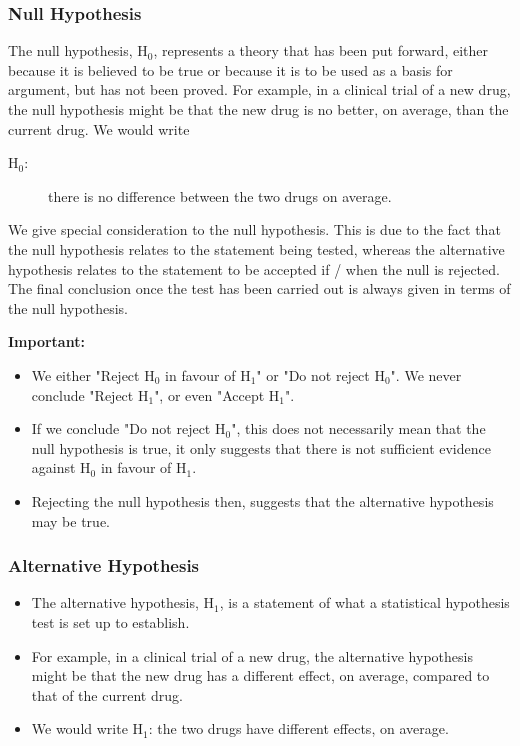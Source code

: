 \documentclass{beamer}
\begin{document}
\begin{frame}
\frametitle{Null Hypothesis}
	The null hypothesis, H$_0$, represents a theory that has been put
	forward, either because it is believed to be true or because it is to
	be used as a basis for argument, but has not been proved.
	For example, in a clinical trial of a new drug, the null hypothesis
	might be that the new drug is no better, on average, than the
	current drug. We would write
	\begin{description}
		\item[H$_0$:] there is no difference between the two drugs on average.
	\end{description}
	We give special consideration to the null hypothesis. This is due to
	the fact that the null hypothesis relates to the statement being
	tested, whereas the alternative hypothesis relates to the statement
	to be accepted if / when the null is rejected.
	The final conclusion once the test has been carried out is always
	given in terms of the null hypothesis.
\end{frame}
\begin{frame}
\noindent \textbf{Important:}
\begin{itemize}
	\item 	We either "Reject H$_0$ in favour of H$_1$" or "Do not reject H$_0$".
	We never conclude "Reject H$_1$", or even "Accept H$_1$".
	\item If we conclude "Do not reject H$_0$", this does not necessarily mean
	that the null hypothesis is true, it only suggests that there is not
	sufficient evidence against H$_0$ in favour of H$_1$.
	\item Rejecting the null hypothesis then, suggests that the alternative
	hypothesis may be true.
\end{itemize}

\end{frame}
\begin{frame}
	\frametitle{Alternative Hypothesis}
\begin{itemize}
	\item 	The alternative hypothesis, H$_1$, is a statement of what a statistical
	hypothesis test is set up to establish.
	\item For example, in a clinical trial
	of a new drug, the alternative hypothesis might be that the new
	drug has a different effect, on average, compared to that of the
	current drug.
	\item We would write
	H$_1$: the two drugs have different effects, on average.
\end{itemize}

\end{frame}
\end{document}
